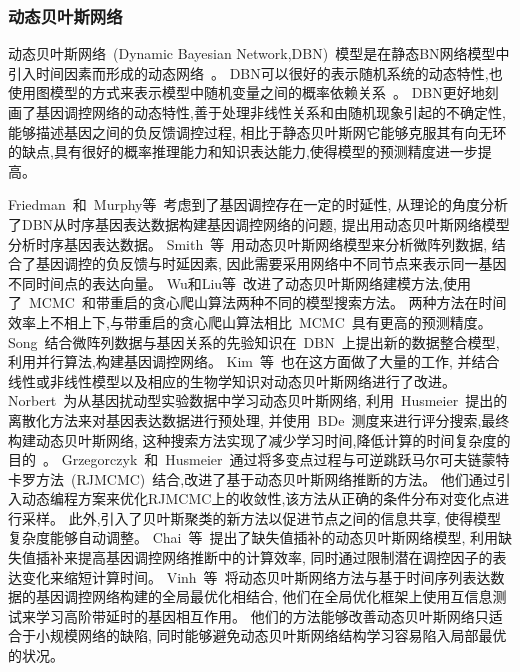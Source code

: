 \subsubsection{动态贝叶斯网络}
动态贝叶斯网络~(Dynamic Bayesian Network,DBN)~模型是在静态BN网络模型中引入时间因素而形成的动态网络~\cite{dondelinger2010heterogeneous,grzegorczyk2010improvements}。
DBN可以很好的表示随机系统的动态特性,也使用图模型的方式来表示模型中随机变量之间的概率依赖关系~\cite{hecker2009gene}。
DBN更好地刻画了基因调控网络的动态特性,善于处理非线性关系和由随机现象引起的不确定性,能够描述基因之间的负反馈调控过程,
相比于静态贝叶斯网它能够克服其有向无环的缺点,具有很好的概率推理能力和知识表达能力,使得模型的预测精度进一步提高。

Friedman~和~Murphy等~\cite{friedman2004inferring}考虑到了基因调控存在一定的时延性,
从理论的角度分析了DBN从时序基因表达数据构建基因调控网络的问题, 提出用动态贝叶斯网络模型分析时序基因表达数据。
Smith~等~\cite{smith2006computational}用动态贝叶斯网络模型来分析微阵列数据,
结合了基因调控的负反馈与时延因素, 因此需要采用网络中不同节点来表示同一基因不同时间点的表达向量。
Wu和Liu等~\cite{wu2008dynamic}改进了动态贝叶斯网络建模方法,使用了~MCMC~和带重启的贪心爬山算法两种不同的模型搜索方法。 
两种方法在时间效率上不相上下,与带重启的贪心爬山算法相比~MCMC~具有更高的预测精度。
Song~\cite{song2009keller}结合微阵列数据与基因关系的先验知识在~DBN~上提出新的数据整合模型,利用并行算法,构建基因调控网络。
Kim~等~\cite{del2010efficient}也在这方面做了大量的工作,
并结合线性或非线性模型以及相应的生物学知识对动态贝叶斯网络进行了改进。
Norbert~\cite{netrapalli2010greedy}为从基因扰动型实验数据中学习动态贝叶斯网络,
利用~Husmeier~\cite{werhli2006comparative}提出的离散化方法来对基因表达数据进行预处理,
并使用~BDe~测度来进行评分搜索,最终构建动态贝叶斯网络, 这种搜索方法实现了减少学习时间,降低计算的时间复杂度的目的~\cite{hurley2011gene}。
Grzegorczyk~和~Husmeier~\cite{grzegorczyk2010improvements}通过将多变点过程与可逆跳跃马尔可夫链蒙特卡罗方法~(RJMCMC)~结合,改进了基于动态贝叶斯网络推断的方法。 他们通过引入动态编程方案来优化RJMCMC上的收敛性,该方法从正确的条件分布对变化点进行采样。 
此外,引入了贝叶斯聚类的新方法以促进节点之间的信息共享, 使得模型复杂度能够自动调整。
Chai~等~\cite{chai2012inferring}提出了缺失值插补的动态贝叶斯网络模型,
利用缺失值插补来提高基因调控网络推断中的计算效率,
同时通过限制潜在调控因子的表达变化来缩短计算时间。
Vinh~等~\cite{vinh2012gene}将动态贝叶斯网络方法与基于时间序列表达数据的基因调控网络构建的全局最优化相结合,
他们在全局优化框架上使用互信息测试来学习高阶带延时的基因相互作用。
他们的方法能够改善动态贝叶斯网络只适合于小规模网络的缺陷,
同时能够避免动态贝叶斯网络结构学习容易陷入局部最优的状况。

